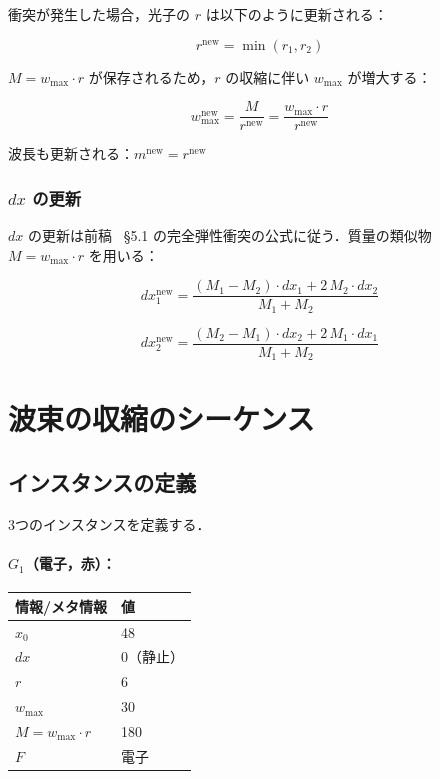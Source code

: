 \documentclass[12pt,a4paper]{ltjsarticle}
\begin{document}
衝突が発生した場合，光子の $r$ は以下のように更新される：

\begin{equation}
r^{\text{new}} = \min(r_1, r_2)
\end{equation}

$M = w_{\max} \cdot r$ が保存されるため，$r$ の収縮に伴い $w_{\max}$ が増大する：

\begin{equation}
w_{\max}^{\text{new}} = \frac{M}{r^{\text{new}}} = \frac{w_{\max} \cdot r}{r^{\text{new}}}
\end{equation}

波長も更新される：$m^{\text{new}} = r^{\text{new}}$

\subsubsection*{$dx$ の更新}

$dx$ の更新は前稿~\cite{ref4} \S5.1 の完全弾性衝突の公式に従う．質量の類似物 $M = w_{\max} \cdot r$ を用いる：

\begin{equation}
dx_1^{\text{new}} = \frac{(M_1 - M_2) \cdot dx_1 + 2\, M_2 \cdot dx_2}{M_1 + M_2}
\end{equation}

\begin{equation}
dx_2^{\text{new}} = \frac{(M_2 - M_1) \cdot dx_2 + 2\, M_1 \cdot dx_1}{M_1 + M_2}
\end{equation}

\section{波束の収縮のシーケンス}

\subsection{インスタンスの定義}

3つのインスタンスを定義する．

\paragraph{$G_1$（電子，赤）：}

\begin{table}[h]
\centering
\begin{tabular}{ll}
\toprule
情報/メタ情報 & 値 \\
\midrule
$x_0$ & 48 \\
$dx$ & 0（静止） \\
$r$ & 6 \\
$w_{\max}$ & 30 \\
$M = w_{\max} \cdot r$ & 180 \\
$F$ & 電子 \\
\bottomrule
\end{tabular}
\end{table}
\end{document}
